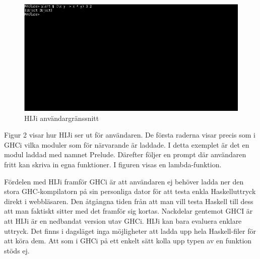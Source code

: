 
\begin{figure}[H]
    \begin{center}
        \includegraphics[width=1\textwidth]{hiji_screen3.png}
        \caption{HIJi användargränssnitt}
    \end{center}
\end{figure}

Figur 2 visar hur HIJi ser ut för användaren. De första raderna visar precis som i GHCi vilka moduler som för närvarande är laddade. I detta exemplet är det en modul laddad med namnet Prelude. Därefter följer en prompt där användaren fritt kan skriva in egna funktioner. I figuren visas en lambda-funktion.



Fördelen med HIJi framför GHCi är att användaren ej behöver ladda ner den stora GHC-kompilatorn på sin personliga dator för att testa enkla Haskelluttryck direkt i webbläsaren. Den åtgångna tiden från  att man vill testa Haskell till dess att man faktiskt sitter med det framför sig kortas. 
Nackdelar gentemot GHCI är att HIJi är en nedbandat version utav GHCi. HIJi kan bara evaluera enklare uttryck. Det finns i dagsläget inga möjligheter att ladda upp hela Haskell-filer för att köra dem. Att som i GHCi på ett enkelt sätt kolla upp  typen av en funktion stöds ej.

